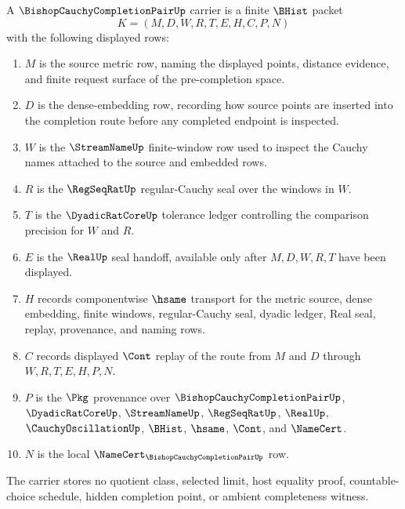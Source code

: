 \begin{definition}
\label{def:bishop-cauchy-completion-pair-carrier}
A $\BishopCauchyCompletionPairUp$ carrier is a finite $\BHist$ packet
$$
K=(M,D,W,R,T,E,H,C,P,N)
$$
with the following displayed rows:
\begin{enumerate}
\item $M$ is the source metric row, naming the displayed points, distance evidence, and finite request surface of the pre-completion space.
\item $D$ is the dense-embedding row, recording how source points are inserted into the completion route before any completed endpoint is inspected.
\item $W$ is the $\StreamNameUp$ finite-window row used to inspect the Cauchy names attached to the source and embedded rows.
\item $R$ is the $\RegSeqRatUp$ regular-Cauchy seal over the windows in $W$.
\item $T$ is the $\DyadicRatCoreUp$ tolerance ledger controlling the comparison precision for $W$ and $R$.
\item $E$ is the $\RealUp$ seal handoff, available only after $M,D,W,R,T$ have been displayed.
\item $H$ records componentwise $\hsame$ transport for the metric source, dense embedding, finite windows, regular-Cauchy seal, dyadic ledger, Real seal, replay, provenance, and naming rows.
\item $C$ records displayed $\Cont$ replay of the route from $M$ and $D$ through $W,R,T,E,H,P,N$.
\item $P$ is the $\Pkg$ provenance over $\BishopCauchyCompletionPairUp$, $\DyadicRatCoreUp$, $\StreamNameUp$, $\RegSeqRatUp$, $\RealUp$, $\CauchyOscillationUp$, $\BHist$, $\hsame$, $\Cont$, and $\NameCert$.
\item $N$ is the local $\NameCert_{\BishopCauchyCompletionPairUp}$ row.
\end{enumerate}
The carrier stores no quotient class, selected limit, host equality proof, countable-choice schedule, hidden completion point, or ambient completeness witness.
\end{definition}

